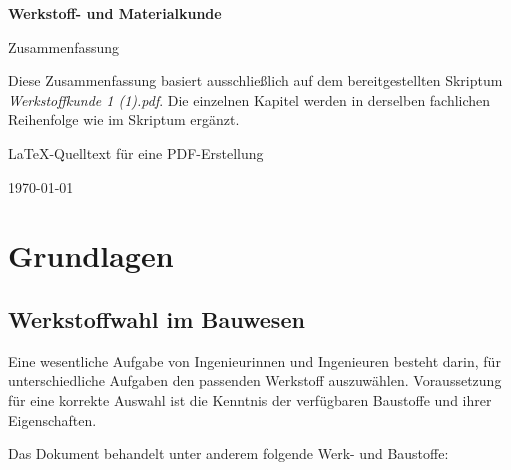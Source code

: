 \documentclass[
  12pt,
  a4paper,
  oneside
]{scrreprt}
\begin{document}
\begin{titlepage}
  \centering
  \vspace*{3cm}

  {\Huge\bfseries Werkstoff- und Materialkunde\par}
  \vspace{0.5cm}
  {\Large Zusammenfassung\par}

  \vspace{1.5cm}

  \begin{tcolorbox}[
    colback=gray!8,
    colframe=black!60,
    width=0.88\textwidth,
    arc=1.5mm
  ]
  Diese Zusammenfassung basiert ausschließlich auf dem bereitgestellten
  Skriptum \textit{Werkstoffkunde 1 (1).pdf}. Die einzelnen Kapitel
  werden in derselben fachlichen Reihenfolge wie im Skriptum ergänzt.
  \end{tcolorbox}

  \vfill

  {\large LaTeX-Quelltext für eine PDF-Erstellung\par}
  \vspace{0.5cm}
  {\large \today\par}
\end{titlepage}

\tableofcontents
\clearpage

\chapter{Grundlagen}

\section{Werkstoffwahl im Bauwesen}

Eine wesentliche Aufgabe von Ingenieurinnen und Ingenieuren besteht
darin, für unterschiedliche Aufgaben den passenden Werkstoff
auszuwählen. Voraussetzung für eine korrekte Auswahl ist die Kenntnis
der verfügbaren Baustoffe und ihrer Eigenschaften. 

Das Dokument behandelt unter anderem folgende Werk- und Baustoffe:
\end{document}
